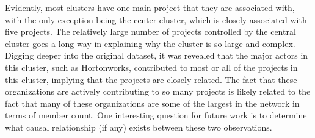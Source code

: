 Evidently, most clusters have one main project that they are associated with, with the only exception being the center cluster, which is closely associated with five projects. The relatively large number of projects controlled by the central cluster goes a long way in explaining why the cluster is so large and complex. Digging deeper into the original dataset, it was revealed that the major actors in this cluster, such as Hortonworks, contributed to most or all of the projects in this cluster, implying that the projects are closely related. The fact that these organizations are actively contributing to so many projects is likely related to the fact that many of these organizations are some of the largest in the network in terms of member count. One interesting question for future work is to determine what causal relationship (if any) exists between these two observations.
